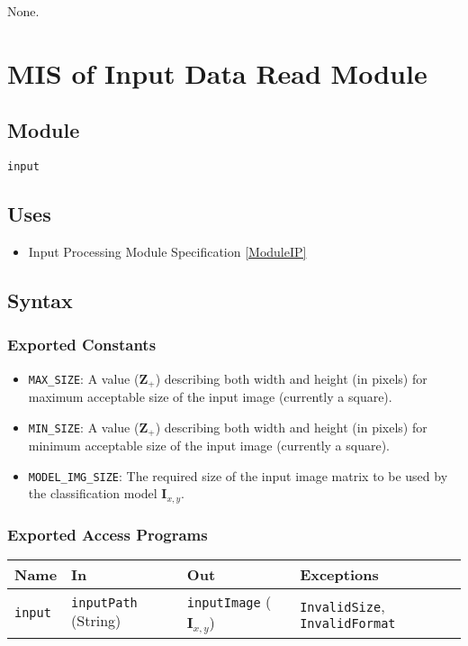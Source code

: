 \documentclass[12pt, titlepage]{article}
\def\code#1{\texttt{#1}}
\begin{document}
None.

\section{MIS of Input Data Read Module} \label{ModuleIDR} 

\subsection{Module}

\code{input}

\subsection{Uses}

\begin{itemize}
  \item Input Processing Module Specification \ref{ModuleIP}
\end{itemize}

\subsection{Syntax}

\subsubsection{Exported Constants}

\begin{itemize}
  \item \code{MAX_SIZE}: A value ($\mathbf{Z}_{+}$) describing both width and height (in pixels) for maximum acceptable 
size of the input image (currently a square).
  \item \code{MIN_SIZE}: A value ($\mathbf{Z}_{+}$) describing both width and height (in pixels) for minimum acceptable 
size of the input image (currently a square).
  \item \code{MODEL_IMG_SIZE}: The required size of the input image matrix to be used by the classification model $\mathbf{I}_{x,y}$.
\end{itemize}

\subsubsection{Exported Access Programs}

\begin{center}
\begin{tabular}{p{2cm} p{4cm} p{4cm} p{2cm}}
\hline
\textbf{Name} & \textbf{In} & \textbf{Out} & \textbf{Exceptions} \\
\hline
\code{input} & \code{inputPath} (String) & \code{inputImage} ($\mathbf{I}_{x,y}$) & \code{InvalidSize}, \code{InvalidFormat} \\
\hline
\end{tabular}
\end{center}
\end{document}
